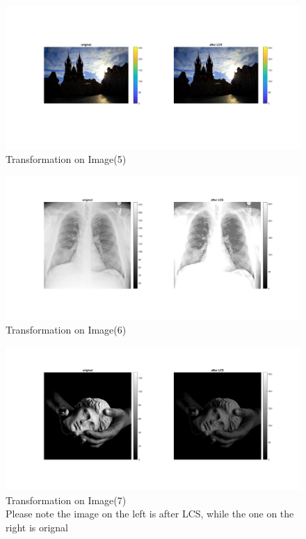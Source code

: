 \documentclass[12pt, a4paper]{article}
\begin{document}
\newpage
\renewcommand{\thefigure}{2.5}
\begin{figure}[H]
    \centering
    \includegraphics[width=\textwidth]{b5.jpg}
    \vspace*{-75pt}
    \caption{Transformation on Image(5)}
    \label{fig:2.5}
\end{figure}
\renewcommand{\thefigure}{2.6}
\begin{figure}[H]
    \centering
    \vspace*{-30pt}
    \includegraphics[width=\textwidth]{b6.jpg}
    \vspace*{-50pt}
    \caption{Transformation on Image(6)}
    \label{fig:2.6}
\end{figure}
\renewcommand{\thefigure}{2.7}
\begin{figure}[H]
    \centering
    \vspace*{-30pt}
    \includegraphics[width=\textwidth]{b7.jpg}
    \vspace*{-60pt}
    \caption{Transformation on Image(7) \\Please note the image on the left is after LCS, while the one on the right is orignal}
    \label{fig:2.7}
\end{figure}
\newpage
\end{document}
